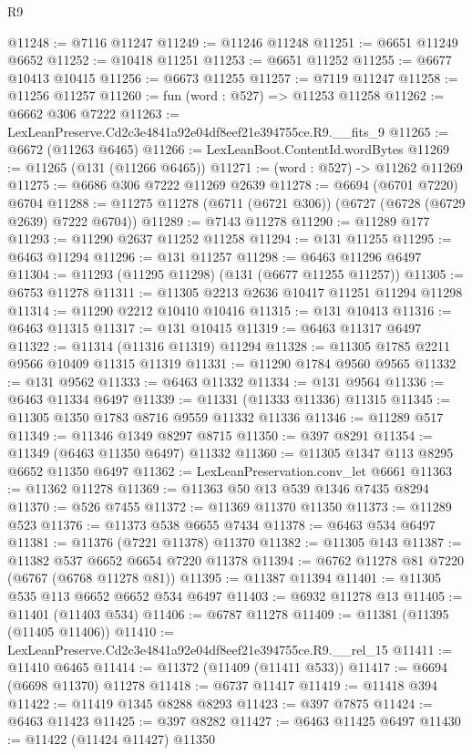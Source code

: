 \begin{lexlean}{R9}
\begin{coremodule}
@11248 := @7116 @11247
@11249 := @11246 @11248
@11251 := @6651 @11249 @6652
@11252 := @10418 @11251
@11253 := @6651 @11252
@11255 := @6677 @10413 @10415
@11256 := @6673 @11255
@11257 := @7119 @11247
@11258 := @11256 @11257
@11260 := fun (word : @527) => @11253 @11258
@11262 := @6662 @306 @7222
@11263 := LexLeanPreserve.Cd2c3e4841a92e04df8eef21e394755ce.R9.__fits_9
@11265 := @6672 (@11263 @6465)
@11266 := LexLeanBoot.ContentId.wordBytes
@11269 := @11265 (@131 (@11266 @6465))
@11271 := (word : @527) -> @11262 @11269
@11275 := @6686 @306 @7222 @11269 @2639
@11278 := @6694 (@6701 @7220) @6704
@11288 := @11275 @11278 (@6711 (@6721 @306)) (@6727 (@6728 (@6729 @2639) @7222 @6704))
@11289 := @7143 @11278
@11290 := @11289 @177
@11293 := @11290 @2637 @11252 @11258
@11294 := @131 @11255
@11295 := @6463 @11294
@11296 := @131 @11257
@11298 := @6463 @11296 @6497
@11304 := @11293 (@11295 @11298) (@131 (@6677 @11255 @11257))
@11305 := @6753 @11278
@11311 := @11305 @2213 @2636 @10417 @11251 @11294 @11298
@11314 := @11290 @2212 @10410 @10416
@11315 := @131 @10413
@11316 := @6463 @11315
@11317 := @131 @10415
@11319 := @6463 @11317 @6497
@11322 := @11314 (@11316 @11319) @11294
@11328 := @11305 @1785 @2211 @9566 @10409 @11315 @11319
@11331 := @11290 @1784 @9560 @9565
@11332 := @131 @9562
@11333 := @6463 @11332
@11334 := @131 @9564
@11336 := @6463 @11334 @6497
@11339 := @11331 (@11333 @11336) @11315
@11345 := @11305 @1350 @1783 @8716 @9559 @11332 @11336
@11346 := @11289 @517
@11349 := @11346 @1349 @8297 @8715
@11350 := @397 @8291
@11354 := @11349 (@6463 @11350 @6497) @11332
@11360 := @11305 @1347 @113 @8295 @6652 @11350 @6497
@11362 := LexLeanPreservation.conv_let @6661
@11363 := @11362 @11278
@11369 := @11363 @50 @13 @539 @1346 @7435 @8294
@11370 := @526 @7455
@11372 := @11369 @11370 @11350
@11373 := @11289 @523
@11376 := @11373 @538 @6655 @7434
@11378 := @6463 @534 @6497
@11381 := @11376 (@7221 @11378) @11370
@11382 := @11305 @143
@11387 := @11382 @537 @6652 @6654 @7220 @11378
@11394 := @6762 @11278 @81 @7220 (@6767 (@6768 @11278 @81))
@11395 := @11387 @11394
@11401 := @11305 @535 @113 @6652 @6652 @534 @6497
@11403 := @6932 @11278 @13
@11405 := @11401 (@11403 @534)
@11406 := @6787 @11278
@11409 := @11381 (@11395 (@11405 @11406))
@11410 := LexLeanPreserve.Cd2c3e4841a92e04df8eef21e394755ce.R9.__rel_15
@11411 := @11410 @6465
@11414 := @11372 (@11409 (@11411 @533))
@11417 := @6694 (@6698 @11370) @11278
@11418 := @6737 @11417
@11419 := @11418 @394
@11422 := @11419 @1345 @8288 @8293
@11423 := @397 @7875
@11424 := @6463 @11423
@11425 := @397 @8282
@11427 := @6463 @11425 @6497
@11430 := @11422 (@11424 @11427) @11350

\end{coremodule}
\end{lexlean}
